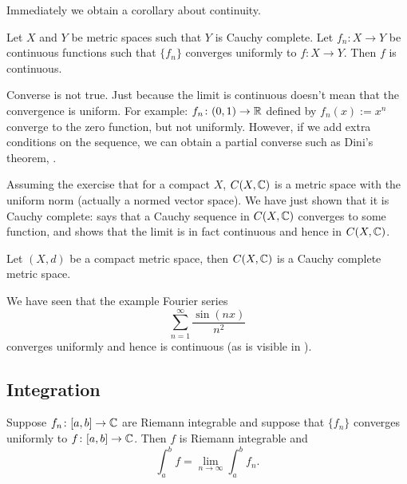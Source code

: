 Immediately we obtain a corollary about continuity.

\begin{cor} \label{cor:metricuniformcontinuous}
Let $X$ and $Y$ be metric spaces such that $Y$ is Cauchy complete.
Let $f_n \colon X \to Y$ be continuous functions
such that
$\{ f_n \}$ converges uniformly to $f \colon X \to Y$.  
Then $f$ is continuous.
\end{cor}

Converse is not true.  Just because the limit is continuous doesn't mean
that the convergence is uniform.  For example:
$f_n \colon (0,1) \to {\mathbb{R}}$ defined by $f_n(x) := x^n$ converge to
the zero function, but not uniformly.  However, if we add extra conditions
on the sequence, we can obtain a partial converse such as Dini's theorem,
.

Assuming the exercise that for a compact $X$, $C(X,{\mathbb{C}})$ is a metric space with
the uniform norm (actually a normed vector space).  We have just shown that
it is Cauchy complete:   says that a Cauchy
sequence in $C(X,{\mathbb{C}})$ converges to some function,
and  shows that the limit is in fact
continuous and hence in $C(X,{\mathbb{C}})$.

\begin{cor}
Let $(X,d)$ be a compact metric space, then $C(X,{\mathbb{C}})$ is a Cauchy
complete metric space.
\end{cor}

\begin{example}
We have seen that the example Fourier series 
\begin{equation*}
\sum_{n=1}^\infty \frac{\sin(nx)}{n^2}
\end{equation*}
converges uniformly and hence is continuous (as is visible
in ).
\end{example}

\subsection{Integration}

\begin{prop} \label{prop:complexlimitswapintegral}
Suppose $f_n \colon [a,b] \to {\mathbb{C}}$
are Riemann integrable and suppose that $\{ f_n \}$ converges
uniformly to $f \colon [a,b] \to {\mathbb{C}}$.  Then $f$ is Riemann integrable
and
\begin{equation*}
\int_a^b f = \lim_{n\to \infty} \int_a^b f_n .
\end{equation*}
\end{prop}

